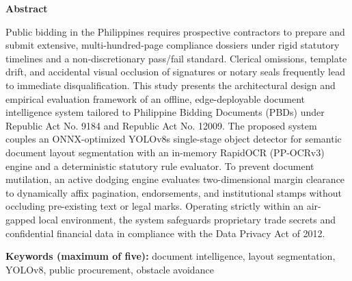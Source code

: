 \begin{center}
\vspace*{1\baselineskip}
{\fontsize{14pt}{17pt}\selectfont\textbf{Abstract}}
\vspace{1\baselineskip}
\end{center}

\begin{singlespace}
\noindent
Public bidding in the Philippines requires prospective contractors to prepare and submit extensive, multi-hundred-page compliance dossiers under rigid statutory timelines and a non-discretionary pass/fail standard.
Clerical omissions, template drift, and accidental visual occlusion of signatures or notary seals frequently lead to immediate disqualification.
This study presents the architectural design and empirical evaluation framework of an offline, edge-deployable document intelligence system tailored to Philippine Bidding Documents (PBDs) under Republic Act No. 9184 and Republic Act No. 12009.
The proposed system couples an ONNX-optimized YOLOv8s single-stage object detector for semantic document layout segmentation with an in-memory RapidOCR (PP-OCRv3) engine and a deterministic statutory rule evaluator.
To prevent document mutilation, an active dodging engine evaluates two-dimensional margin clearance to dynamically affix pagination, endorsements, and institutional stamps without occluding pre-existing text or legal marks.
Operating strictly within an air-gapped local environment, the system safeguards proprietary trade secrets and confidential financial data in compliance with the Data Privacy Act of 2012.

\vspace{2\baselineskip}

\noindent\textbf{Keywords (maximum of five):} document intelligence, layout segmentation, YOLOv8, public procurement, obstacle avoidance
\end{singlespace}
\newpage
